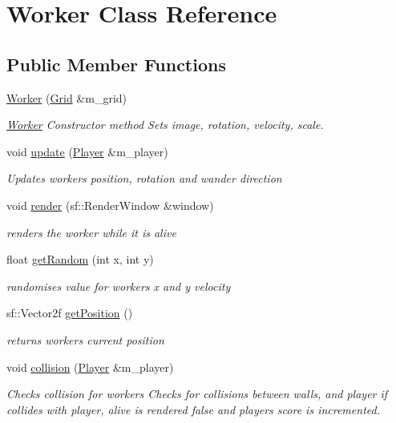 \hypertarget{class_worker}{}\section{Worker Class Reference}
\label{class_worker}
\subsection*{Public Member Functions}
\begin{DoxyCompactItemize}
\item 
\mbox{\hyperlink{class_worker_a82c83970e5f0d42f2e81390153f9c312}{Worker}} (\mbox{\hyperlink{class_grid}{Grid}} \&m\+\_\+grid)
\begin{DoxyCompactList}\small\item\em \mbox{\hyperlink{class_worker}{Worker}} Constructor method Sets image, rotation, velocity, scale. \end{DoxyCompactList}\item 
void \mbox{\hyperlink{class_worker_a876d7118b9196abe5d3299a941ee5643}{update}} (\mbox{\hyperlink{class_player}{Player}} \&m\+\_\+player)
\begin{DoxyCompactList}\small\item\em Updates workers position, rotation and wander direction \end{DoxyCompactList}\item 
void \mbox{\hyperlink{class_worker_a18940af5e921feefc2373e120d66ff24}{render}} (sf\+::\+Render\+Window \&window)
\begin{DoxyCompactList}\small\item\em renders the worker while it is alive \end{DoxyCompactList}\item 
float \mbox{\hyperlink{class_worker_adc26f6c33bf87fe8464924b688b35924}{get\+Random}} (int x, int y)
\begin{DoxyCompactList}\small\item\em randomises value for workers x and y velocity \end{DoxyCompactList}\item 
sf\+::\+Vector2f \mbox{\hyperlink{class_worker_a47aa8d5eb21900530255e6a66b7801d9}{get\+Position}} ()
\begin{DoxyCompactList}\small\item\em returns workers current position \end{DoxyCompactList}\item 
void \mbox{\hyperlink{class_worker_a6b05fdee2acc4a485e68814f98cd1075}{collision}} (\mbox{\hyperlink{class_player}{Player}} \&m\+\_\+player)
\begin{DoxyCompactList}\small\item\em Checks collision for workers Checks for collisions between walls, and player if collides with player, alive is rendered false and players score is incremented. \end{DoxyCompactList}\end{DoxyCompactItemize}
